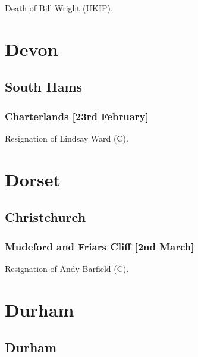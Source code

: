 \documentclass[a4paper,openany]{book}
\begin{document}
\begin{resultsiii}

Death of Bill Wright (UKIP).

\section{Devon}

\subsection*{South Hams}

\subsubsection*{Charterlands \hspace*{\fill}\nolinebreak[1]%
\enspace\hspace*{\fill}
[23rd February]}


Resignation of Lindsay Ward (C).

\section{Dorset}

\subsection*{Christchurch}

\subsubsection*{Mudeford and Friars Cliff \hspace*{\fill}\nolinebreak[1]%
\enspace\hspace*{\fill}
[2nd March]}


Resignation of Andy Barfield (C).

\section{Durham}

\subsection*{Durham}


\end{resultsiii}
\end{document}
